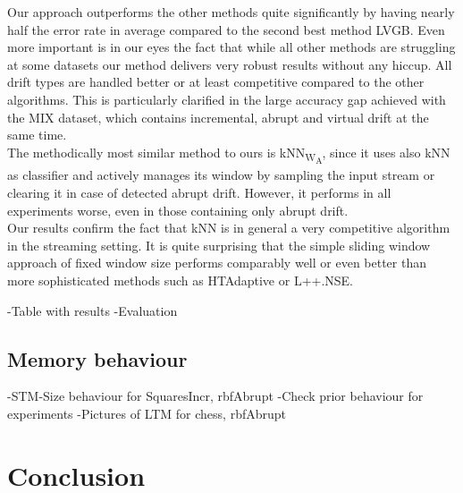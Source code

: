 \documentclass[conference]{IEEEtran}
\begin{document}
Our approach outperforms the other methods quite significantly by having nearly half the error rate in average compared to the second best method LVGB. 
Even more important is in our eyes the fact that while all other methods are struggling at some datasets our method delivers very robust results without any hiccup. All drift types are handled
better or at least competitive compared to the other algorithms. This is particularly clarified in the large accuracy gap achieved with the MIX dataset, which contains incremental, 
abrupt and virtual drift at the same time. \\
The methodically most similar method to ours is kNN\textsubscript{W\textsubscript{A}}, since it uses also kNN as classifier and actively manages its window by sampling the input stream or clearing it in case of detected abrupt drift.
However, it performs in all experiments worse, even in those containing only abrupt drift.\\
Our results confirm the fact that kNN is in general a very competitive algorithm in the streaming setting. It is quite surprising that the simple sliding window approach of fixed window size 
performs comparably well or even better than more sophisticated methods such as HTAdaptive or L++.NSE.

-Table with results
-Evaluation
\subsection{Memory behaviour}
-STM-Size behaviour for SquaresIncr, rbfAbrupt
-Check prior behaviour for experiments
-Pictures of LTM for chess, rbfAbrupt


\section{Conclusion}

\newpage



%
%
%



\end{document}
